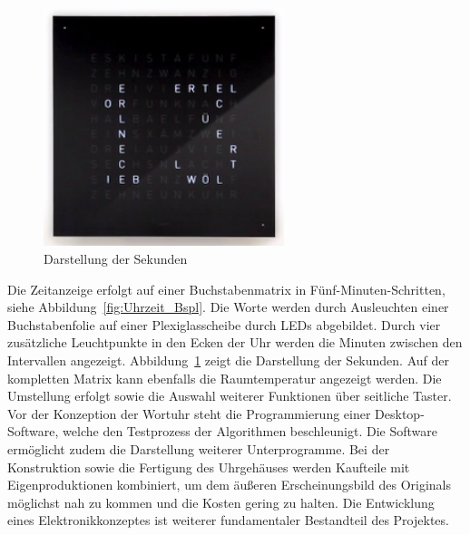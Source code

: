  \begin{figure}[t]
    \centering
    \includegraphics[width=7cm]{Abbildungen/Sekunden}
    \caption[Sekunden]{Darstellung der Sekunden}
    \label{fig:Sekunden}
\end{figure}
%
  \begin{multicols}{2}
Die Zeitanzeige erfolgt auf einer Buchstabenmatrix in Fünf-Minuten-Schritten, siehe Abbildung~\ref{fig:Uhrzeit_Bspl}. Die Worte werden durch Ausleuchten einer Buchstabenfolie auf einer Plexiglasscheibe durch LEDs abgebildet. Durch vier zusätzliche Leuchtpunkte in den Ecken der Uhr werden die Minuten zwischen den Intervallen angezeigt. Abbildung~\ref{fig:Sekunden} zeigt die Darstellung der Sekunden. Auf der kompletten Matrix kann ebenfalls die Raumtemperatur angezeigt werden. Die Umstellung erfolgt sowie die Auswahl weiterer Funktionen über seitliche Taster. Vor der Konzeption der Wortuhr steht die Programmierung einer Desktop-Software, welche den Testprozess der Algorithmen beschleunigt. Die Software ermöglicht zudem die Darstellung weiterer Unterprogramme. 
Bei der Konstruktion sowie die Fertigung des Uhrgehäuses werden Kaufteile mit Eigenproduktionen kombiniert, um dem äußeren Erscheinungsbild des Originals möglichst nah zu kommen und die Kosten gering zu halten. Die Entwicklung eines Elektronikkonzeptes ist  weiterer fundamentaler Bestandteil des Projektes.
\end{multicols}



